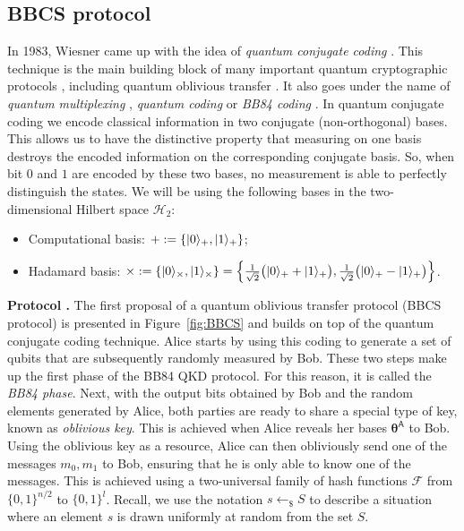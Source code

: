 \subsection{BBCS protocol}\label{sec:BBCS}

In 1983, Wiesner came up with the idea of \textit{quantum conjugate coding} \cite{W83}. This technique is the main building block of many important quantum cryptographic protocols \cite{BB84, BBBW83, DFSS14}, including quantum oblivious transfer \cite{BBCS92}. It also goes under the name of \textit{quantum multiplexing} \cite{BBBW83}, \textit{quantum coding} \cite{BBB14} or \textit{BB84 coding} \cite{S99}. In quantum conjugate coding we encode classical information in two conjugate (non-orthogonal) bases. This allows us to have the distinctive property that measuring on one basis destroys the encoded information on the corresponding conjugate basis. So, when bit $0$ and $1$ are encoded by these two bases, no measurement is able to perfectly distinguish the states. We will be using the following bases in the two-dimensional Hilbert space $\mathcal{H}_2$:

\begin{itemize}
    \item Computational basis: $+ := \left\{| 0 \rangle_{+}, | 1 \rangle_{+}\right\}$;
    \item Hadamard basis: $\times := \left\{| 0 \rangle_{\times}, | 1 \rangle_{\times}\right\} = \left\{\frac{1}{\sqrt{2}}\big( | 0 \rangle_{+} + | 1 \rangle_{+} \big), \frac{1}{\sqrt{2}}\big( | 0 \rangle_{+} - | 1 \rangle_{+} \big) \right\}$.
\end{itemize}

\noindent\textbf{Protocol \cite{BBCS92}.} The first proposal of a quantum oblivious transfer protocol (BBCS protocol) is presented in Figure~\ref{fig:BBCS} and builds on top of the quantum conjugate coding technique. Alice starts by using this coding to generate a set of qubits that are subsequently randomly measured by Bob. These two steps make up the first phase of the BB84 QKD protocol. For this reason, it is called the \textit{BB84 phase}. Next, with the output bits obtained by Bob and the random elements generated by Alice, both parties are ready to share a special type of key, known as \textit{oblivious key}. This is achieved when Alice reveals her bases $\bm{\theta}^{\mathsf{A}}$ to Bob. Using the oblivious key as a resource, Alice can then obliviously send one of the messages $m_0, m_1$ to Bob, ensuring that he is only able to know one of the messages. This is achieved using a two-universal family of hash functions $\mathcal{F}$ from $\{0,1\}^{n/2}$ to $\{0,1\}^{l}$. Recall, we use the notation $s\leftarrow_{\$}S$ to describe a situation where an element $s$ is drawn uniformly at random from the set $S$.

